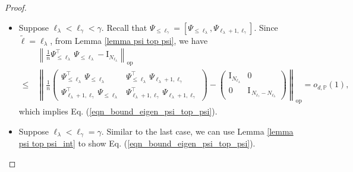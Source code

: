 \documentclass{article}
\theoremstyle{plain}
\theoremstyle{definition}
\theoremstyle{remark}
\newcommand{\green}{\color{green}}
\newcommand{\dhnote}[1]{{\color{red}[#1]} } %
\begin{document}
\begin{appendix}
\begin{proof}
\begin{itemize}
    \item Suppose  $\ell_{\lambda}<\ell_{\gamma}<\gamma$. Recall that $\Psi_{\leq \ell_{\gamma}} = \left[\Psi_{\leq \ell_{\lambda}}, \Psi_{\ell_{\lambda}+1, \ell_{\gamma}}\right]$. 
    Since $\tilde{\ell}=\ell_{\lambda}$, from Lemma \ref{lemma psi top psi}, we have
\begin{align*}
&~ \left\| \frac{1}{n}
\Psi_{\leq \ell_\lambda}^{\top}\,\Psi_{\leq \ell_\lambda} - 
\mathrm{I}_{N_{\ell_\lambda}} \right\|_{\mathrm{op}}\\
    \leq &~ \left\| \frac{1}{n}
\begin{pmatrix}
  \Psi_{\leq \ell_\lambda}^{\top}\,\Psi_{\leq \ell_\lambda}
  & 
  \Psi_{\leq \ell_\lambda}^{\top}\,\Psi_{\ell_\lambda+1,\ell_{\gamma}}
  \\[1em]
  \Psi_{\ell_\lambda+1,\ell_{\gamma}}^{\top}\,\Psi_{\leq \ell_\lambda}
  & 
  \Psi_{\ell_\lambda+1,\ell_{\gamma}}^{\top}\,\Psi_{\ell_\lambda+1,\ell_{\gamma}}
\end{pmatrix} - \begin{pmatrix}
\mathrm{I}_{N_{\ell_\lambda}} & 0 \\[0.5em]
0 & \mathrm{I}_{\,N_{\ell_{\gamma}}-N_{\ell_\lambda}}
\end{pmatrix} \right\|_{\mathrm{op}} = o_{d, \mathbb{P}}(1),
\end{align*}
    which implies Eq. (\ref{eqn_bound_eigen_psi_top_psi}).

    \item Suppose $\ell_{\lambda}<\ell_{\gamma} = \gamma$. Similar to the last case, we can use Lemma \ref{lemma psi top psi_int} to show Eq. (\ref{eqn_bound_eigen_psi_top_psi}).
\end{itemize}















\end{proof}
\end{appendix}
\end{document}
